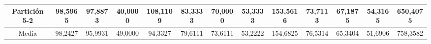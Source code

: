 \documentclass[12pt]{article}
\begin{document}
\begin{table}[H]
{\begin{tabular}{|c|cccc|cccc|cccc|}
Partición 5-2 & \multicolumn{1}{c|}{98,5965}                                                  & \multicolumn{1}{c|}{97,8873}                                                 & \multicolumn{1}{c|}{40,0000} & 108,1109 & \multicolumn{1}{c|}{83,3333}                                                  & \multicolumn{1}{c|}{70,0000}                                                 & \multicolumn{1}{c|}{53,3333} & 153,5616 & \multicolumn{1}{c|}{73,7113}                                                  & \multicolumn{1}{c|}{67,1875}                                                 & \multicolumn{1}{c|}{54,3165} & 650,4075 \\ \hline
Media         & \multicolumn{1}{c|}{98,2427}                                                  & \multicolumn{1}{c|}{95,9931}                                                 & \multicolumn{1}{c|}{49,0000} & 94,3327  & \multicolumn{1}{c|}{79,6111}                                                  & \multicolumn{1}{c|}{73,6111}                                                 & \multicolumn{1}{c|}{53,2222} & 154,6825 & \multicolumn{1}{c|}{76,5314}                                                  & \multicolumn{1}{c|}{65,3404}                                                 & \multicolumn{1}{c|}{51,6906} & 758,3582 \\ \hline
\end{tabular}}
\end{table}
\end{document}
